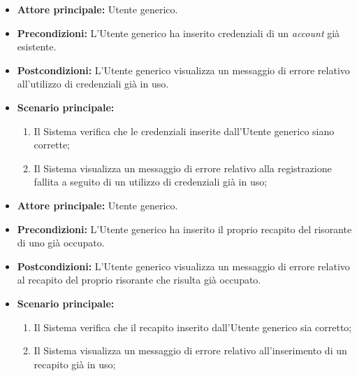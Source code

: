 \label{usecase:Errore registrazione account esistente}
\begin{itemize}

	\item \textbf{Attore principale:} Utente generico.

	\item \textbf{Precondizioni:} L'Utente generico ha inserito credenziali di un \textit{account} già esistente.

	\item \textbf{Postcondizioni:} L'Utente generico visualizza un messaggio di errore relativo all'utilizzo di credenziali già in uso.

	\item \textbf{Scenario principale:}
	\begin{enumerate}
        \item Il Sistema verifica che le credenziali inserite dall'Utente generico siano corrette;
        \item Il Sistema visualizza un messaggio di errore relativo alla registrazione fallita a seguito di un utilizzo di credenziali già in uso;
	\end{enumerate}
	
\end{itemize}

\label{usecase:Errore registrazione recapito occupato}
\begin{itemize}

	\item \textbf{Attore principale:} Utente generico.

	\item \textbf{Precondizioni:} L'Utente generico ha inserito il proprio recapito del risorante di uno già occupato.
	
	\item \textbf{Postcondizioni:} L'Utente generico visualizza un messaggio di errore relativo al recapito del proprio risorante che risulta già occupato.

	\item \textbf{Scenario principale:}
	\begin{enumerate}
        \item Il Sistema verifica che il recapito inserito dall'Utente generico sia corretto;
        \item Il Sistema visualizza un messaggio di errore relativo all'inserimento di un recapito già in uso;
	\end{enumerate}
	
\end{itemize}